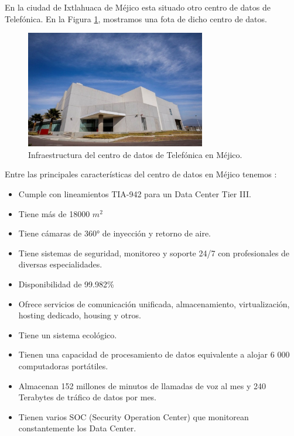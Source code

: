 \documentclass{article}
\begin{document}
En la ciudad de Ixtlahuaca de Méjico esta situado otro centro de datos de Telefónica. En la Figura \ref{img:mexico}, mostramos una fota de dicho centro de datos. 

\begin{figure}[H]
	\centering
	\includegraphics[width=0.7\textwidth]{img/datacenter/mexico}	
	\caption{Infraestructura del centro de datos de Telefónica en Méjico.}
	\label{img:mexico}
\end{figure}

Entre las principales características del centro de datos en Méjico tenemos \citep{telefonicamexico}:

\begin{itemize}
	\item Cumple con lineamientos TIA-942 para un Data Center Tier III.
	\item Tiene más de 18000 $m^2$
	\item Tiene cámaras de 360° de inyección y retorno de aire.
	\item Tiene sistemas de seguridad, monitoreo y soporte 24/7 con profesionales de diversas especialidades.
	\item Disponibilidad de 99.982\%
	\item Ofrece servicios de comunicación unificada, almacenamiento, virtualización, hosting dedicado, housing y otros.
	\item Tiene un sistema ecológico. 
	\item Tienen una capacidad de procesamiento de datos equivalente a alojar 6 000 computadoras portátiles.
	\item Almacenan 152 millones de minutos de llamadas de voz al mes y 240 Terabytes de tráfico de datos por mes.
	\item Tienen varios SOC (Security Operation Center) que monitorean constantemente los Data Center.
	
\end{itemize}
	
\end{document}
